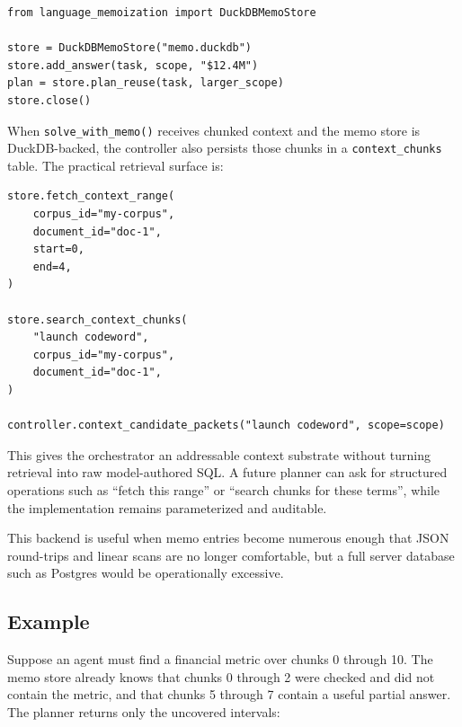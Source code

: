 \documentclass[11pt]{article}
\begin{document}
\begin{verbatim}
from language_memoization import DuckDBMemoStore

store = DuckDBMemoStore("memo.duckdb")
store.add_answer(task, scope, "$12.4M")
plan = store.plan_reuse(task, larger_scope)
store.close()
\end{verbatim}

When \texttt{solve\_with\_memo()} receives chunked context and the memo store is
DuckDB-backed, the controller also persists those chunks in a
\texttt{context\_chunks} table. The practical retrieval surface is:

\begin{verbatim}
store.fetch_context_range(
    corpus_id="my-corpus",
    document_id="doc-1",
    start=0,
    end=4,
)

store.search_context_chunks(
    "launch codeword",
    corpus_id="my-corpus",
    document_id="doc-1",
)

controller.context_candidate_packets("launch codeword", scope=scope)
\end{verbatim}

This gives the orchestrator an addressable context substrate without turning
retrieval into raw model-authored SQL. A future planner can ask for structured
operations such as ``fetch this range'' or ``search chunks for these terms'',
while the implementation remains parameterized and auditable.

This backend is useful when memo entries become numerous enough that JSON
round-trips and linear scans are no longer comfortable, but a full server
database such as Postgres would be operationally excessive.

\subsection{Example}

Suppose an agent must find a financial metric over chunks 0 through 10. The
memo store already knows that chunks 0 through 2 were checked and did not
contain the metric, and that chunks 5 through 7 contain a useful partial
answer. The planner returns only the uncovered intervals:
\end{document}
